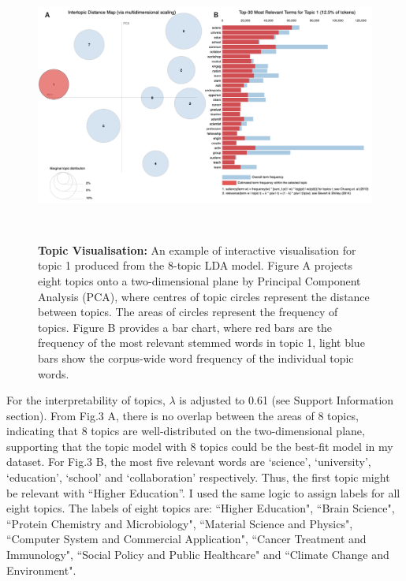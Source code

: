 \begin{figure}[H]
    \centering
    \includegraphics[width = 16cm, height = 9cm]{Code/img/LDAvis.pdf}
    \caption[Interactive visualisation for topic distributions]{\textbf{Topic Visualisation:} An example of interactive visualisation for topic 1 produced from the 8-topic LDA model. Figure A projects eight topics onto a two-dimensional plane by Principal Component Analysis (PCA), where centres of topic circles represent the distance between topics. The areas of circles represent the frequency of topics. Figure B provides a bar chart, where red bars are the frequency of the most relevant stemmed words in topic 1, light blue bars show the corpus-wide word frequency of the individual topic words.}
\end{figure}

For the interpretability of topics, $\lambda$ is adjusted to 0.61 (see Support Information section). From Fig.3 A, there is no overlap between the areas of 8 topics, indicating that 8 topics are well-distributed on the two-dimensional plane, supporting that the topic model with 8 topics could be the best-ﬁt model in my dataset. For Fig.3 B, the most ﬁve relevant words are `science’, `university’, `education’, `school’ and `collaboration’ respectively. Thus, the ﬁrst topic might be relevant with ``Higher Education”. I used the same logic to assign labels for all eight topics. The labels of eight topics are: ``Higher Education", ``Brain Science", ``Protein Chemistry and Microbiology", ``Material Science and Physics", ``Computer System and Commercial Application", ``Cancer Treatment and Immunology", ``Social Policy and Public Healthcare" and ``Climate Change and Environment".

